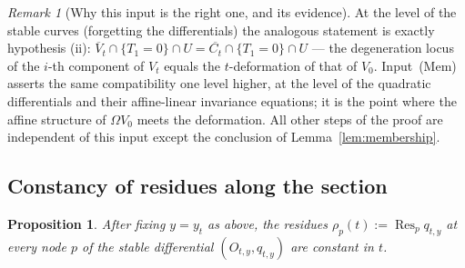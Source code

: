 \documentclass[11pt]{article}
\DeclareMathOperator{\Res}{Res}
\newtheorem{prop}[thm]{Proposition}
\theoremstyle{definition}
\theoremstyle{remark}
\newtheorem{rmk}[thm]{Remark}
\begin{document}
\begin{rmk}[Why this input is the right one, and its evidence]
At the level of the stable curves (forgetting the differentials) the
analogous statement is exactly hypothesis (ii):
$\overline V_t \cap \{T_1 = 0\}\cap U = \overline{C_t} \cap\{T_1=0\}
\cap U$ --- the degeneration locus of the $i$-th component of $V_t$
equals the $t$-deformation of that of $V_0$. Input~(Mem) asserts the
same compatibility one level higher, at the level of the quadratic
differentials and their affine-linear invariance equations; it is the
point where the affine structure of $\Omega V_0$ meets the deformation.
All other steps of the proof are independent of this input except the
conclusion of Lemma~\ref{lem:membership}.
\end{rmk}
\subsection{Constancy of residues along the section}

\begin{prop}\label{prop:constresidue}
After fixing $y = y_t$ as above, the residues
$\rho_p(t) := \Res_p q_{t,y}$ at every node $p$ of the stable
differential $(O_{t,y}, q_{t,y})$ are constant in $t$.
\end{prop}
\end{document}
